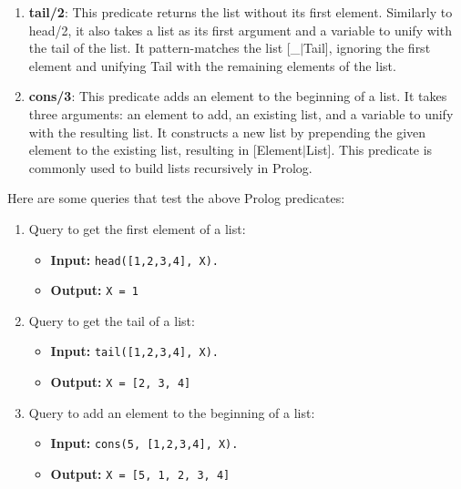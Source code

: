 \documentclass[12pt]{article}
\begin{document}
\begin{spacing}{1.5}
\begin{enumerate}
\begin{enumerate}
		      	\item \textbf{tail/2}: This predicate returns the list without its first element. Similarly to head/2, it also takes a list as its first argument and a variable to unify with the tail of the list. It pattern-matches the list [\_$|$Tail], ignoring the first element and unifying Tail with the remaining elements of the list.
		      	      
		      	\item \textbf{cons/3}: This predicate adds an element to the beginning of a list. It takes three arguments: an element to add, an existing list, and a variable to unify with the resulting list. It constructs a new list by prepending the given element to the existing list, resulting in [Element$|$List]. This predicate is commonly used to build lists recursively in Prolog.
		      \end{enumerate}
		      
		      Here are some queries that test the above Prolog predicates:
		      
		      \begin{enumerate}
		      	\item Query to get the first element of a list:
		      	      \begin{itemize}
		      	      	\item \textbf{Input:} \texttt{head([1,2,3,4], X).}
		      	      	\item \textbf{Output:} \texttt{X = 1} 
		      	      \end{itemize}
		      	      
		      	\item Query to get the tail of a list:
		      	      \begin{itemize}
		      	      	\item \textbf{Input:} \texttt{tail([1,2,3,4], X).}
		      	      	\item \textbf{Output:} \texttt{X = [2, 3, 4]} 
		      	      \end{itemize}
		      	      
		      	\item Query to add an element to the beginning of a list:
		      	      \begin{itemize}
		      	      	\item \textbf{Input:} \texttt{cons(5, [1,2,3,4], X).}
		      	      	\item \textbf{Output:} \texttt{X = [5, 1, 2, 3, 4]} 
		      	      \end{itemize}
		      \end{enumerate}
		      		      

\end{enumerate}
\end{spacing}
\end{document}
